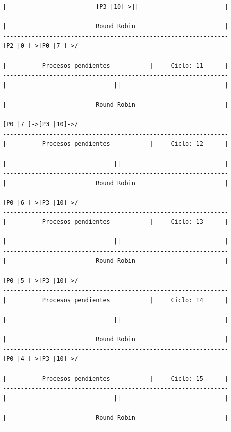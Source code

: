 \documentclass[12pt]{article}
\begin{document}
\begin{verbatim}
|                         [P3 |10]->||                        |
---------------------------------------------------------------
|                         Round Robin                         |
---------------------------------------------------------------
[P2 |0 ]->[P0 |7 ]->/
---------------------------------------------------------------
|          Procesos pendientes           |     Ciclo: 11      |
---------------------------------------------------------------
|                              ||                             |
---------------------------------------------------------------
|                         Round Robin                         |
---------------------------------------------------------------
[P0 |7 ]->[P3 |10]->/
---------------------------------------------------------------
|          Procesos pendientes           |     Ciclo: 12      |
---------------------------------------------------------------
|                              ||                             |
---------------------------------------------------------------
|                         Round Robin                         |
---------------------------------------------------------------
[P0 |6 ]->[P3 |10]->/
---------------------------------------------------------------
|          Procesos pendientes           |     Ciclo: 13      |
---------------------------------------------------------------
|                              ||                             |
---------------------------------------------------------------
|                         Round Robin                         |
---------------------------------------------------------------
[P0 |5 ]->[P3 |10]->/
---------------------------------------------------------------
|          Procesos pendientes           |     Ciclo: 14      |
---------------------------------------------------------------
|                              ||                             |
---------------------------------------------------------------
|                         Round Robin                         |
---------------------------------------------------------------
[P0 |4 ]->[P3 |10]->/
---------------------------------------------------------------
|          Procesos pendientes           |     Ciclo: 15      |
---------------------------------------------------------------
|                              ||                             |
---------------------------------------------------------------
|                         Round Robin                         |
---------------------------------------------------------------

\end{verbatim}
\end{document}
